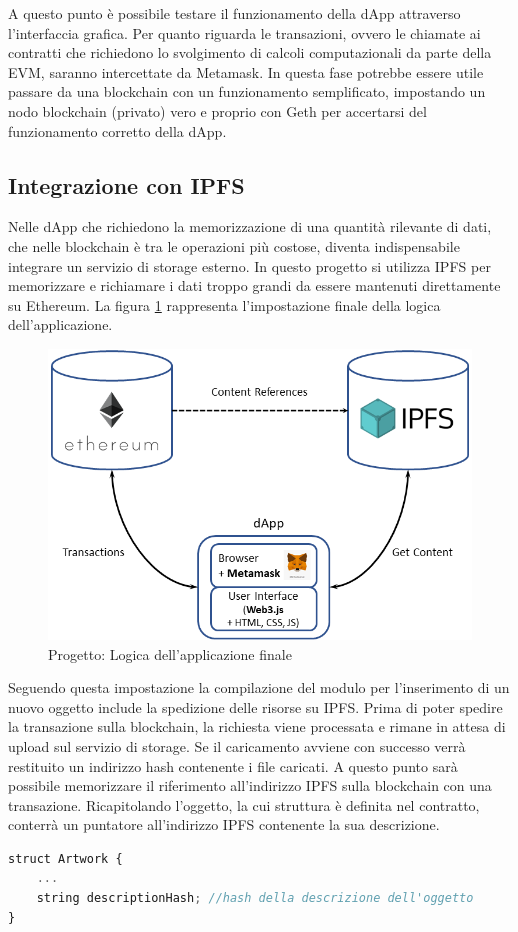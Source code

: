 A questo punto è possibile testare il funzionamento della dApp attraverso l'interfaccia grafica. Per quanto riguarda le transazioni, ovvero le chiamate ai contratti che richiedono lo svolgimento di calcoli computazionali da parte della EVM, saranno intercettate da Metamask. In questa fase potrebbe essere utile passare da una blockchain con un funzionamento semplificato, impostando un nodo blockchain (privato) vero e proprio con Geth per accertarsi del funzionamento corretto della dApp.

\subsection{Integrazione con IPFS}

Nelle dApp che richiedono la memorizzazione di una quantità rilevante di dati, che nelle blockchain è tra le operazioni più costose, diventa indispensabile integrare un servizio di storage esterno. In questo progetto si utilizza IPFS per memorizzare e richiamare i dati troppo grandi da essere mantenuti direttamente su Ethereum. La figura \ref{fig:dapp} rappresenta l'impostazione finale della logica dell’applicazione.

\begin{figure}[H]
\centering
\includegraphics[width=1\textwidth]{immagini/ipfsIntegration.png}
\caption{Progetto: Logica dell'applicazione finale}
\label{fig:dapp}
\end{figure}

Seguendo questa impostazione la compilazione del modulo per l’inserimento di un nuovo oggetto include la spedizione delle risorse su IPFS. Prima di poter spedire la transazione sulla blockchain, la richiesta viene processata e rimane in attesa di upload sul servizio di storage. Se il caricamento avviene con successo verrà restituito un indirizzo hash contenente i file caricati. A questo punto sarà possibile memorizzare il riferimento all'indirizzo IPFS sulla blockchain con una transazione. Ricapitolando l'oggetto, la cui struttura è definita nel contratto, conterrà un puntatore all'indirizzo IPFS contenente la sua descrizione.
\\
\begin{lstlisting}[caption={Riferimento all'indirizzo hash di IPFS},language=JavaScript]
struct Artwork {
    ...
    string descriptionHash; //hash della descrizione dell'oggetto 
}
\end{lstlisting}

